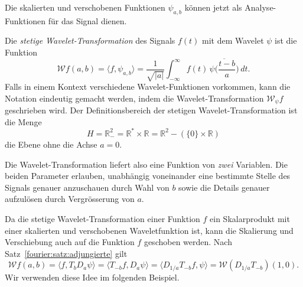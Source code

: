 
Die skalierten und verschobenen Funktionen $\psi_{a,b}$ können jetzt als
Analyse-Funktionen für das Signal dienen.

\begin{definition}
\label{cwt:definition}
Die {\em stetige Wavelet-Transformation} des Signals $f(t)$ mit dem Wavelet
%
%
$\psi$ ist die Funktion
\begin{equation}
\mathcal{W}f (a,b)
=
\langle f,\psi_{a,b}\rangle
=
\frac{1}{\sqrt{|a|}}\int_{-\infty}^\infty f(t)\,\overline{
\psi\biggl(\frac{t-b}{a}\biggr)}\,dt.
\label{cwt:definition:eq}
\end{equation}
Falls in einem Kontext verschiedene Wavelet-Funktionen vorkommen, kann die
Notation eindeutig gemacht werden, indem die Wavelet-Transformation
$\mathcal{W}_{\psi}f$ geschrieben wird.
Der Definitionsbereich der stetigen Wavelet-Transformation ist die Menge
\[
H
=
\mathbb R^2_-
=
\mathbb R^*\times \mathbb R
=
\mathbb R^2 - (\{0\}\times \mathbb R)
\]
die Ebene ohne die Achse $a=0$.
\end{definition}

Die Wavelet-Transformation liefert also eine Funktion von {\em zwei}
Variablen.
Die beiden Parameter erlauben, unabhängig voneinander eine bestimmte
Stelle des Signals genauer anzuschauen durch Wahl von $b$ sowie die
Details genauer aufzulösen durch Vergrösserung von $a$.

Da die stetige Wavelet-Transformation einer Funktion $f$ ein Skalarprodukt
mit einer skalierten und verschobenen Waveletfunktion ist, kann die Skalierung
und Verschiebung auch auf die Funktion $f$ geschoben werden.
Nach Satz~\ref{fourier:satz:adjungierte} gilt
\begin{equation}
\mathcal{W}f(a,b)
=
\langle f,T_bD_a\psi\rangle
=
\langle T_{-b}f,D_a\psi\rangle
=
\langle D_{1/a}T_{-b}f,\psi\rangle
=
\mathcal{W}(D_{1/a}T_{-b})(1,0).
\label{cwt:formel:shift}
\end{equation}
Wir verwenden diese Idee im folgenden Beispiel.

